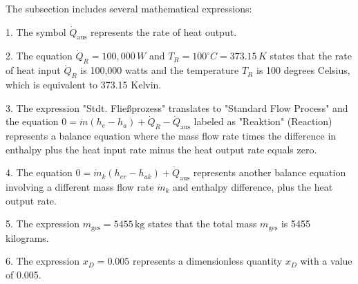 The subsection includes several mathematical expressions:

1. The symbol \( \dot{Q}_{\text{aus}} \) represents the rate of heat output.

2. The equation \( \dot{Q}_R = 100,000 \, W \) and \( T_R = 100^\circ C = 373.15 \, K \) states that the rate of heat input \( \dot{Q}_R \) is 100,000 watts and the temperature \( T_R \) is 100 degrees Celsius, which is equivalent to 373.15 Kelvin.

3. The expression "Stdt. Fließprozess" translates to "Standard Flow Process" and the equation \( 0 = \dot{m} (h_e - h_a) + \dot{Q}_R - \dot{Q}_{\text{aus}} \) labeled as "Reaktion" (Reaction) represents a balance equation where the mass flow rate times the difference in enthalpy plus the heat input rate minus the heat output rate equals zero.

4. The equation \( 0 = \dot{m}_k (h_{er} - h_{ak}) + \dot{Q}_{\text{aus}} \) represents another balance equation involving a different mass flow rate \( \dot{m}_k \) and enthalpy difference, plus the heat output rate.

5. The expression \( m_{\text{ges}} = 5455 \, \text{kg} \) states that the total mass \( m_{\text{ges}} \) is 5455 kilograms.

6. The expression \( x_D = 0.005 \) represents a dimensionless quantity \( x_D \) with a value of 0.005.